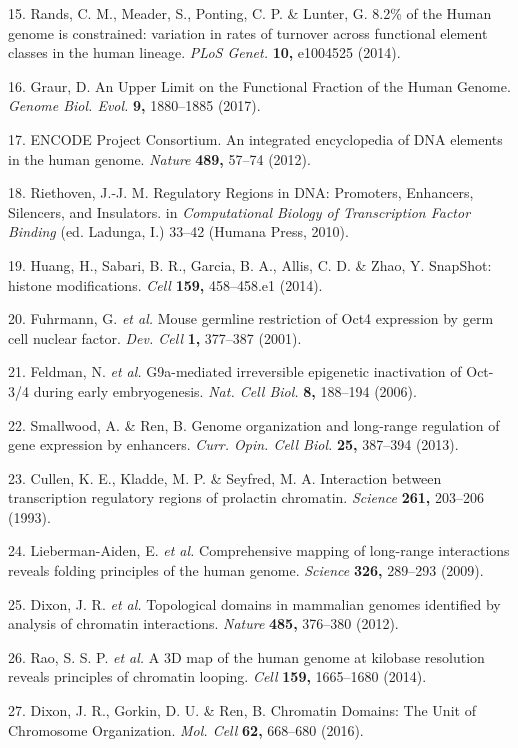 \documentclass[11pt,twoside]{MPIthesis}
\theoremstyle{definition}
\theoremstyle{definition}
\theoremstyle{definition}
\theoremstyle{remark}
\begin{document}
15. Rands, C. M., Meader, S., Ponting, C. P. \& Lunter, G. 8.2\% of the
Human genome is constrained: variation in rates of turnover across
functional element classes in the human lineage. \emph{PLoS Genet.}
\textbf{10,} e1004525 (2014).

16. Graur, D. An Upper Limit on the Functional Fraction of the Human
Genome. \emph{Genome Biol. Evol.} \textbf{9,} 1880--1885 (2017).

17. ENCODE Project Consortium. An integrated encyclopedia of DNA
elements in the human genome. \emph{Nature} \textbf{489,} 57--74 (2012).

18. Riethoven, J.-J. M. Regulatory Regions in DNA: Promoters, Enhancers,
Silencers, and Insulators. in \emph{Computational Biology of
Transcription Factor Binding} (ed. Ladunga, I.) 33--42 (Humana Press,
2010).

19. Huang, H., Sabari, B. R., Garcia, B. A., Allis, C. D. \& Zhao, Y.
SnapShot: histone modifications. \emph{Cell} \textbf{159,} 458--458.e1
(2014).

20. Fuhrmann, G. \emph{et al.} Mouse germline restriction of Oct4
expression by germ cell nuclear factor. \emph{Dev. Cell} \textbf{1,}
377--387 (2001).

21. Feldman, N. \emph{et al.} G9a-mediated irreversible epigenetic
inactivation of Oct-3/4 during early embryogenesis. \emph{Nat. Cell
Biol.} \textbf{8,} 188--194 (2006).

22. Smallwood, A. \& Ren, B. Genome organization and long-range
regulation of gene expression by enhancers. \emph{Curr. Opin. Cell
Biol.} \textbf{25,} 387--394 (2013).

23. Cullen, K. E., Kladde, M. P. \& Seyfred, M. A. Interaction between
transcription regulatory regions of prolactin chromatin. \emph{Science}
\textbf{261,} 203--206 (1993).

24. Lieberman-Aiden, E. \emph{et al.} Comprehensive mapping of
long-range interactions reveals folding principles of the human genome.
\emph{Science} \textbf{326,} 289--293 (2009).

25. Dixon, J. R. \emph{et al.} Topological domains in mammalian genomes
identified by analysis of chromatin interactions. \emph{Nature}
\textbf{485,} 376--380 (2012).

26. Rao, S. S. P. \emph{et al.} A 3D map of the human genome at kilobase
resolution reveals principles of chromatin looping. \emph{Cell}
\textbf{159,} 1665--1680 (2014).

27. Dixon, J. R., Gorkin, D. U. \& Ren, B. Chromatin Domains: The Unit
of Chromosome Organization. \emph{Mol. Cell} \textbf{62,} 668--680
(2016).
\end{document}

